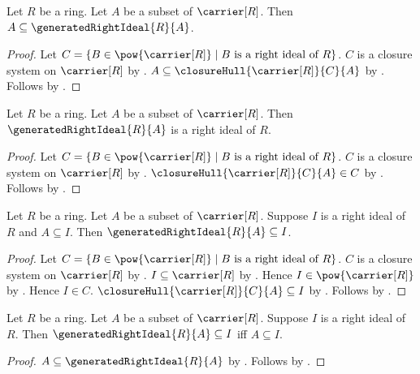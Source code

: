 \begin{proposition}\label{generated_right_ideal_contains_generators}
    Let $R$ be a ring.
    Let $A$ be a subset of $\carrier[R]$.
    Then $A\subseteq\generatedRightIdeal{R}{A}$.
\end{proposition}
\begin{proof}
    Let
        $C=\{B\in\pow{\carrier[R]}\mid
            \text{$B$ is a right ideal of $R$}\}$.
    $C$ is a closure system on $\carrier[R]$ by
        .
    $A\subseteq\closureHull{\carrier[R]}{C}{A}$ by
        .
    Follows by .
\end{proof}

\begin{theorem}\label{generated_right_ideal_is_right_ideal}
    Let $R$ be a ring.
    Let $A$ be a subset of $\carrier[R]$.
    Then $\generatedRightIdeal{R}{A}$ is a right ideal of $R$.
\end{theorem}
\begin{proof}
    Let
        $C=\{B\in\pow{\carrier[R]}\mid
            \text{$B$ is a right ideal of $R$}\}$.
    $C$ is a closure system on $\carrier[R]$ by
        .
    $\closureHull{\carrier[R]}{C}{A}\in C$ by
        .
    Follows by .
\end{proof}

\begin{theorem}\label{generated_right_ideal_least}
    Let $R$ be a ring.
    Let $A$ be a subset of $\carrier[R]$.
    Suppose $I$ is a right ideal of $R$ and $A\subseteq I$.
    Then $\generatedRightIdeal{R}{A}\subseteq I$.
\end{theorem}
\begin{proof}
    Let
        $C=\{B\in\pow{\carrier[R]}\mid
            \text{$B$ is a right ideal of $R$}\}$.
    $C$ is a closure system on $\carrier[R]$ by
        .
    $I\subseteq\carrier[R]$ by .
    Hence $I\in\pow{\carrier[R]}$ by .
    Hence $I\in C$.
    $\closureHull{\carrier[R]}{C}{A}\subseteq I$ by
        .
    Follows by .
\end{proof}

\begin{theorem}\label{generated_right_ideal_universal_property}
    Let $R$ be a ring.
    Let $A$ be a subset of $\carrier[R]$.
    Suppose $I$ is a right ideal of $R$.
    Then $\generatedRightIdeal{R}{A}\subseteq I$ iff $A\subseteq I$.
\end{theorem}
\begin{proof}
    $A\subseteq\generatedRightIdeal{R}{A}$ by
        .
    Follows by
        .
\end{proof}

